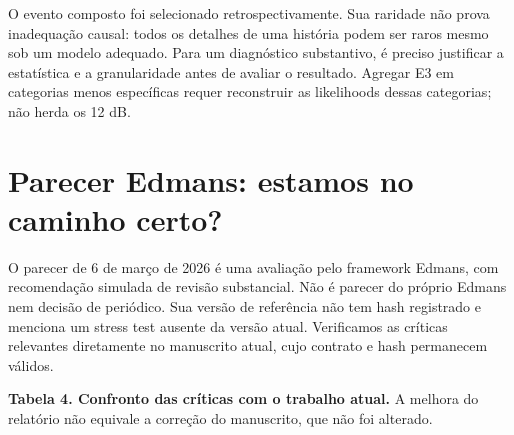 \documentclass[
  brazilian,
  11pt,
  a4paper,
]{article}
\begin{document}
O evento composto foi selecionado retrospectivamente. Sua raridade não
prova inadequação causal: todos os detalhes de uma história podem ser
raros mesmo sob um modelo adequado. Para um diagnóstico substantivo, é
preciso justificar a estatística e a granularidade antes de avaliar o
resultado. Agregar E3 em categorias menos específicas requer reconstruir
as likelihoods dessas categorias; não herda os 12 dB.

\section{Parecer Edmans: estamos no caminho
certo?}\label{parecer-edmans-estamos-no-caminho-certo}

O parecer de 6 de março de 2026 é uma avaliação pelo framework Edmans,
com recomendação simulada de revisão substancial. Não é parecer do
próprio Edmans nem decisão de periódico. Sua versão de referência não
tem hash registrado e menciona um stress test ausente da versão atual.
Verificamos as críticas relevantes diretamente no manuscrito atual, cujo
contrato e hash permanecem válidos.

\textbf{Tabela 4. Confronto das críticas com o trabalho atual.} A
melhora do relatório não equivale a correção do manuscrito, que não foi
alterado.
\end{document}

